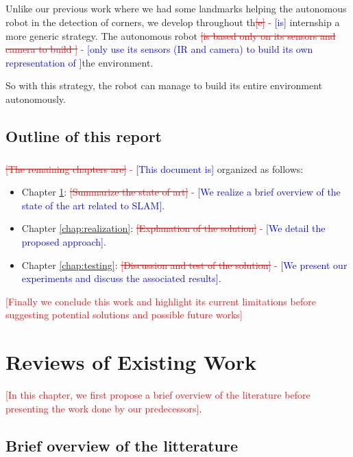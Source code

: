 \documentclass[12pt]{report}
\newcommand{\hcr}[2]{\textcolor{red}{\sout{[#1]} - \textcolor{blue}{ [#2]}}}
\newcommand{\hc}[1]{\textcolor{red}{[#1]}}
\begin{document}
	\paragraph{}
	Unlike our previous work where we had some landmarks helping the autonomous robot in the detection of corners, 
we develop throughout th\hcr{e}{is} internship a more generic strategy. The autonomous robot \hcr{is based only on its 
sensors and camera to build }{only use its sensors (IR and camera) to build its own representation of }the environment.
	
	So with this strategy, the robot can manage to build its entire environment autonomously.
	
	
	\section*{Outline of this report}
	\paragraph{}
	\hcr{The remaining chapters are}{This document is} organized as follows:
	\begin{itemize}
		\item Chapter \ref{chap:review}: \hcr{Summarize the state of art}{We realize a brief overview of the 
state of the art related to SLAM}.
		\item Chapter \ref{chap:realization}: \hcr{Explanation of the solution}{We detail the proposed 
approach}.
		\item Chapter \ref{chap:testing}: \hcr{Discussion and test of the solution}{We present our experiments 
and discuss the associated results}.
	\end{itemize}
	\hc{Finally we conclude this work and highlight its current limitations before suggesting potential solutions 
and possible future works}
	
	
    \chapter{Reviews of Existing Work}
    \label{chap:review}
	
	\hc{In this chapter, we first propose a brief overview of the literature before presenting the work 
done by our predecessors}.

\section{Brief overview of the litterature}
\end{document}
